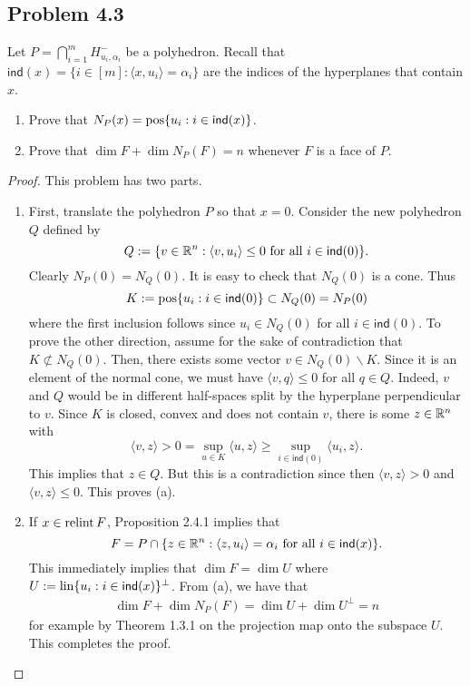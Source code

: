 \documentclass[12pt]{article}
\begin{document}
\newpage 

\subsection{Problem 4.3}

\begin{problem}
	Let $P = \bigcap_{i = 1}^m H_{u_i, \alpha_i}^-$ be a polyhedron. Recall that $\mathsf{ind}(x) = \{i \in [m] : \langle x, u_i \rangle = \alpha_i\}$ are the indices of the hyperplanes that contain $x$. 
    \begin{enumerate}[label = (\alph*)]
        \item Prove that $N_P(x) = \operatorname{pos} \{u_i : i \in \mathsf{ind}(x) \}$.
        \item Prove that $\dim F + \dim N_P(F) = n$ whenever $F$ is a face of $P$. 
    \end{enumerate}
\end{problem}

\begin{proof}
	This problem has two parts. 
	\begin{enumerate}[label = (\alph*)]
		\item First, translate the polyhedron $P$ so that $x = 0$. Consider the new polyhedron $Q$ defined by 
		\[
			Q := \{v \in \mathbb{R}^n : \langle v, u_i \rangle \leq 0 \text{ for all } i \in \mathsf{ind}(0)\}.
		\]
		Clearly $N_P(0) = N_Q(0)$. It is easy to check that $N_Q(0)$ is a cone. Thus 
		\[
			K := \operatorname{pos} \{u_i : i \in \mathsf{ind}(0) \} \subset N_Q(0) = N_P(0)
		\]
		where the first inclusion follows since $u_i \in N_Q(0)$ for all $i \in \mathsf{ind}(0)$. To prove the other direction, assume for the sake of contradiction that $K \not\subset N_Q(0)$. Then, there exists some vector $v \in N_Q(0) \backslash K$. Since it is an element of the normal cone, we must have $\langle v, q \rangle \leq 0$ for all $q \in Q$. Indeed, $v$ and $Q$ would be in different half-spaces split by the hyperplane perpendicular to $v$. Since $K$ is closed, convex and does not contain $v$, there is some $z \in \mathbb{R}^n$ with 
		\[
			\langle v, z \rangle > 0 = \sup_{u \in K} \langle u, z \rangle \geq \sup_{i \in \mathsf{ind}(0)} \langle u_i, z \rangle.
		\]
		This implies that $z \in Q$. But this is a contradiction since then $\langle v, z \rangle > 0$ and $\langle v, z \rangle \leq 0$. This proves (a). 

		\item If $x \in \operatorname{relint} F$, Proposition 2.4.1 implies that 
		\[
			F = P \cap \{z \in \mathbb{R}^n : \langle z, u_i \rangle = \alpha_i \text{ for all } i \in \mathsf{ind}(x)\}.
		\]
		This immediately implies that $\dim F = \dim U$ where $U := \operatorname{lin} \{u_i : i \in \mathsf{ind}(x)\}^\perp$. From (a), we have that 
		\begin{align*}
			\dim F + \dim N_P(F) = \dim U + \dim U^\perp = n
		\end{align*}
		for example by Theorem 1.3.1 on the projection map onto the subspace $U$. This completes the proof. 
	\end{enumerate}
\end{proof}
\end{document}

